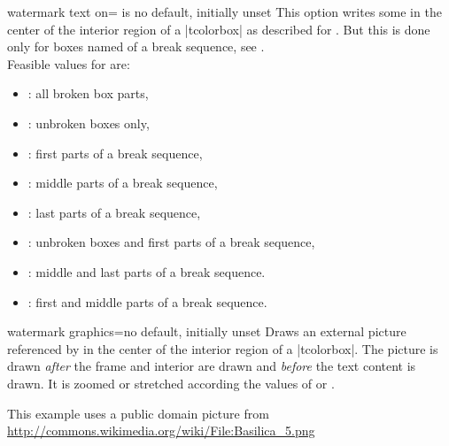 \enlargethispage*{1cm}

\begin{docTcbKey}{watermark text on}{= is }{no default, initially unset}
  This option writes some  in the center of the interior region of a |tcolorbox|
  as described for .
  But this is done only for boxes named  of a break sequence, see
  .\\ 
  Feasible values for  are:
  \begin{itemize}
  \item{}: all broken box parts,
  \item{}: unbroken boxes only,
  \item{}: first parts of a break sequence,
  \item{}: middle parts of a break sequence,
  \item{}: last parts of a break sequence,
  \item{}: unbroken boxes and first parts of a break sequence,
  \item{}: middle and last parts of a break sequence.
  \item{}: first and middle parts of a break sequence.
  \end{itemize}
\end{docTcbKey}


\clearpage


\begin{docTcbKey}{watermark graphics}{=}{no default, initially unset}
  Draws an external picture referenced by 
  in the center of the interior region of a |tcolorbox|.
  The picture is drawn \emph{after} the
  frame and interior are drawn and \emph{before} the text content is drawn.
  It is zoomed or stretched according the values of
   or .
\begin{dispExample}

\begin{tcolorbox}[enhanced,title=My title,watermark graphics=Basilica_5.png,
  watermark opacity=0.15]
\lipsum[1-2]
\tcblower
This example uses a public domain picture from\\
\url{http://commons.wikimedia.org/wiki/File:Basilica_5.png}
\end{tcolorbox}
\end{dispExample}
\end{docTcbKey}


